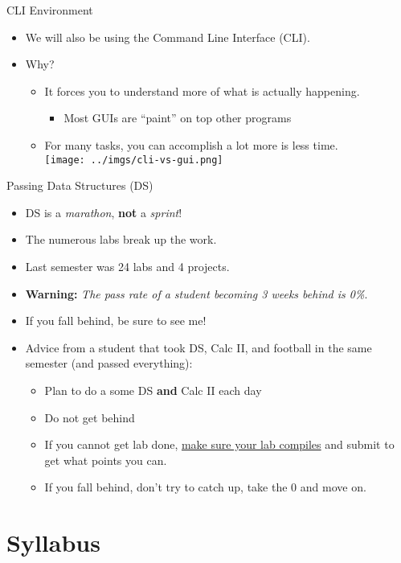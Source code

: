 \documentclass{beamer}
\begin{document}
\begin{frame}{CLI Environment}
\begin{itemize}
\item We will also be using the Command Line Interface (CLI).
\item Why?
\begin{itemize}
\item It forces you to understand more of what is actually happening.
\begin{itemize}
\item Most GUIs are ``paint'' on top other programs
\end{itemize}
\item For many tasks, you can accomplish a lot more is less time. \\
\texttt{[image: ../imgs/cli-vs-gui.png]}
\end{itemize}
\end{itemize}
\end{frame}

\begin{frame}{Passing Data Structures (DS)}
\begin{itemize}
\item DS is a \textit{marathon}, \textbf{not} a \textit{sprint}!
\item The numerous labs break up the work.
\item Last semester was 24 labs and 4 projects.
\item \textbf{Warning:} \textit{The pass rate of a student becoming 3 weeks behind is 0\%}.
\item If you fall behind, be sure to see me!
\item Advice from a student that took DS, Calc II, and football in the same semester (and passed everything):
\begin{itemize}
\item Plan to do a some DS \textbf{and} Calc II each day
\item Do not get behind
\item If you cannot get lab done, \underline{make sure your lab compiles} and submit to get what points you can.
\item If you fall behind, don't try to catch up, take the 0 and move on.
\end{itemize}
\end{itemize}
\end{frame}


\section{Syllabus}
\end{document}
